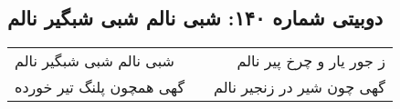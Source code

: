 \begin{center}
\section*{دوبیتی شماره ۱۴۰: شبی نالم شبی شبگیر نالم}
\label{sec:140}
\begin{longtable}{l p{0.5cm} r}
شبی نالم شبی شبگیر نالم
&&
ز جور یار و چرخ پیر نالم
\\
گهی همچون پلنگ تیر خورده
&&
گهی چون شیر در زنجیر نالم
\\
\end{longtable}
\end{center}
